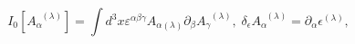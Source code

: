 \begin{equation}
I_{0}\left[ A_{\alpha }^{\;\;(\lambda )}\right] =\int d^{3}x\varepsilon
^{\alpha \beta \gamma }A_{\alpha (\lambda )}\partial _{\beta }A_{\gamma
}^{\;\;(\lambda )},\;\delta _{\epsilon }A_{\alpha }^{\;\;(\lambda
)}=\partial _{\alpha }\epsilon ^{(\lambda )},  \label{bf104}
\end{equation}

